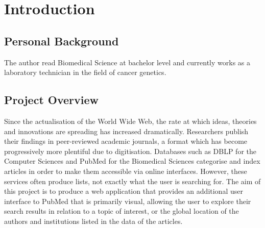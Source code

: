 \documentclass[PROP_AGutteridge_CS.tex]{subfiles}
\begin{document}
\chapter{Introduction}
\section{Personal Background}
The author read Biomedical Science at bachelor level and currently works as a laboratory technician in the field of cancer genetics.

\section{Project Overview}
	Since the actualisation of the World Wide Web, the rate at which ideas, theories and innovations are spreading has increased dramatically. Researchers publish their findings in peer-reviewed academic journals, a format which has become progressively more plentiful due to digitisation. Databases such as DBLP for the Computer Sciences and PubMed for the Biomedical Sciences categorise and index articles in order to make them accessible via online interfaces. However, these services often produce lists, not exactly what the user is searching for. The aim of this project is to produce a web application that provides an additional user interface to PubMed that is primarily visual, allowing the user to explore their search results in relation to a topic of interest, or the global location of the authors and institutions listed in the data of the articles. 
\end{document}
